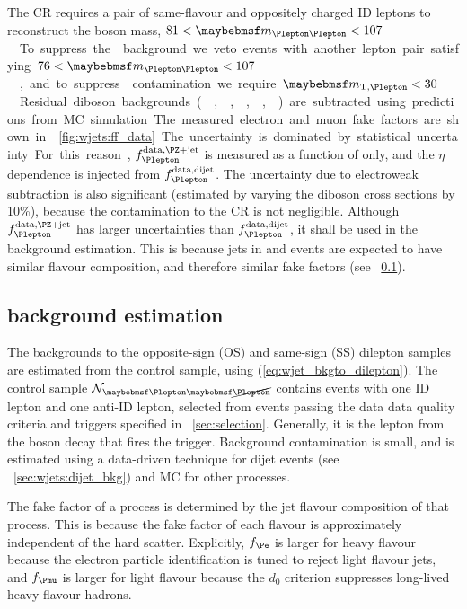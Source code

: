 The \Zjets CR requires a pair of same-flavour and oppositely charged ID 
leptons to reconstruct the \PZ boson mass, \unit{$81 < \mll < 107$}{\GeV}. To suppress 
the \ZZ background we veto events with another lepton pair satisfying 
\unit{$76 < \mll < 107$}{\GeV}, and to suppress \WZ contamination we require 
\unit{$\mtw < 30$}{\GeV}. Residual diboson backgrounds (\Zgamma, \ZZ, \Zgstar, \WZ, 
\Wgstar) are subtracted using predictions from MC simulation.

The measured electron and muon fake factors are shown in \Figure~\ref{fig:wjets:ff_data}. 
The uncertainty is dominated by statistical uncertainty. For this reason, 
$f_{\Plepton}^{\text{data,\Zjets}}$ is measured as a function of \pt only, and the $\eta$ 
dependence is injected from $f_{\Plepton}^{\text{data,dijet}}$. The uncertainty due to 
electroweak subtraction is also significant (estimated by varying the diboson cross sections by 10\%), because the contamination to the \Zjets CR is not negligible. Although 
$f_{\Plepton}^{\text{data,\Zjets}}$ has larger uncertainties than 
$f_{\Plepton}^{\text{data,dijet}}$, it shall be used in the \Wjets background estimation. 
This is because jets in \Zjets and \Wjets events are expected to have similar flavour 
composition, and therefore similar fake factors (see \Section~\ref{sec:wjets:wjet_bkg}).



\subsection{\Wjets background estimation}
\label{sec:wjets:wjet_bkg}

The \Wjets backgrounds to the opposite-sign (OS) and same-sign (SS) dilepton samples are 
estimated from the \Wjets control sample, using (\ref{eq:wjet_bkgto_dilepton}). The 
\Wjets control sample $\mathcal{N}_{\id{\Plepton}\antiid{\Plepton}}$ contains events with 
one ID lepton and one anti-ID lepton, selected from events passing the data data quality 
criteria and triggers specified in \Section~\ref{sec:selection}. Generally, it is the 
lepton from the \PW boson decay that fires the trigger. Background contamination is 
small, and is estimated using a data-driven technique for dijet events (see 
\Section~\ref{sec:wjets:dijet_bkg}) and MC for other processes.

The fake factor of a process is determined by the jet flavour composition of that 
process. This is because the fake factor of each flavour is approximately independent of 
the hard scatter. Explicitly, $f_{\Pe}$ is larger for heavy flavour because the electron 
particle identification is tuned to reject light flavour jets, and $f_{\Pmu}$ is larger 
for light flavour because the $d_0$ criterion suppresses long-lived heavy flavour hadrons.

